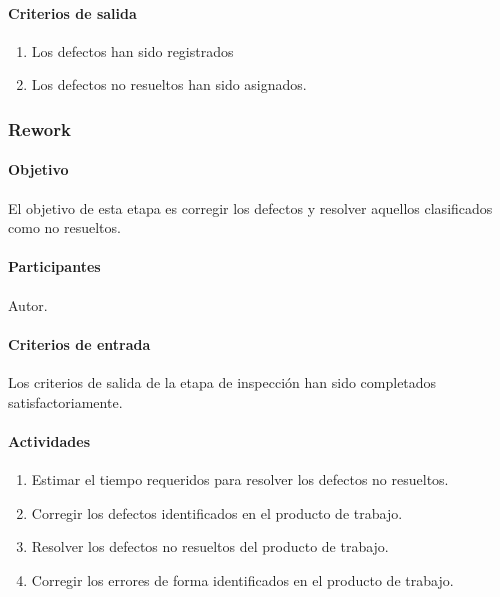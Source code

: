 \paragraph{Criterios de salida}

\begin{enumerate}
	\item
	Los defectos han sido registrados
	\item
	Los defectos no resueltos han sido asignados.
\end{enumerate}

\subsubsection{Rework}

\paragraph{Objetivo\\}

El objetivo de esta etapa es corregir los defectos y resolver aquellos clasificados como no resueltos.

\paragraph{Participantes\\}

Autor.

\paragraph{Criterios de entrada\\}

Los criterios de salida de la etapa de inspección han sido completados satisfactoriamente.

\paragraph{Actividades}

\begin{enumerate}
	\item
		Estimar el tiempo requeridos para resolver los defectos no resueltos.
	\item
		Corregir los defectos identificados en el producto de trabajo.
	\item
		Resolver los defectos no resueltos del producto de trabajo.
	\item
		Corregir los errores de forma identificados en el producto de trabajo.
\end{enumerate}


